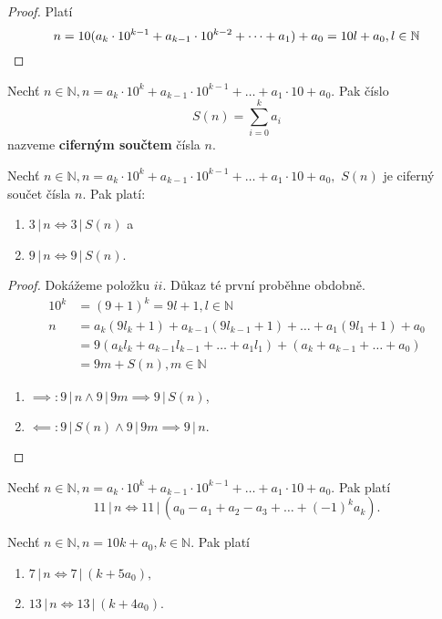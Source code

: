 \begin{proof}
Platí
  $$n = 10(a_k\cdot 10^{k-1}+a_{k-1}\cdot 10 ^{k-2}+\dots+a_1)+a_0 = 10l+a_0, l\in \mathbb N\qedhere$$
\end{proof}

\begin{definition}
  Nechť $n\in \mathbb N, n=a_k\cdot 10^k+a_{k-1}\cdot 10^{k-1}+\dots + a_1\cdot 10 + a_0.$ Pak číslo
  $$S(n) = \sum_{i=0}^k a_i$$
  nazveme \textbf{ciferným součtem} čísla $n$.
\end{definition}

\begin{veta}
  Nechť $n\in \mathbb N, n=a_k\cdot 10^k+a_{k-1}\cdot 10^{k-1}+\dots + a_1\cdot 10 + a_0,$ $S(n)$ je ciferný součet čísla $n$. Pak platí:
  \begin{enumerate}[$i.$]
    \item $3\, | \, n \iff 3 \, | \, S(n)$ a
    \item $9\, | \, n \iff 9 \, | \, S(n)$.
  \end{enumerate}
\end{veta}

\begin{proof}
  Dokážeme položku $ii$. Důkaz té první proběhne obdobně.
  \begin{align*}
    10^k & = (9+1)^k = 9l+1, l \in \mathbb N \\
    n & = a_k(9l_k+1)+a_{k-1}(9l_{k-1}+1)+\dots + a_1(9l_1+1)+a_0 \\
      & = 9(a_kl_k+a_{k-1}l_{k-1}+\dots+a_1l_1)+(a_k+a_{k-1}+\dots+a_0) \\
      & = 9m+S(n), m \in \mathbb N
  \end{align*}
  \begin{enumerate}
    \item $\implies: 9 \, | \, n \land 9 \, | \, 9m \implies 9 \, | \, S(n)$,
    \item $\impliedby: 9 \, | \, S(n) \land 9 \, | \, 9m \implies 9 \, | \, n.$ \qedhere
  \end{enumerate}
\end{proof}

\begin{veta}
  Nechť $n\in \mathbb N, n=a_k\cdot 10^k + a_{k-1}\cdot 10^{k-1}+\dots+a_1\cdot 10+ a_0$. Pak platí
  \[
    11 \, | \, n \iff 11 \, | \, (a_0-a_1+a_2-a_3+\dots+(-1)^k a_k).
  \]
\end{veta}

\begin{veta}
  Nechť $n\in \mathbb N, n=10k+a_0,k\in \mathbb N.$ Pak platí
  \begin{enumerate}[$i.$]
    \item $7 \, | \, n \iff 7 \, | \, (k+5a_0),$
    \item $13 \, | \, n \iff 13 \, | \, (k+4a_0) $.
  \end{enumerate}
\end{veta}

